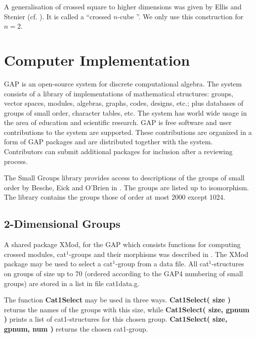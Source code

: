 \documentclass[a4paper,11pt]{article}
\theoremstyle{plain}
\theoremstyle{definition}
\begin{document}
A generalisation of crossed square to higher dimensions was given by Ellis
and Stenier (cf. \cite{Sten}). 
It is called a \textquotedblleft crossed $n$-cube \textquotedblright. 
We only use this construction for $n=2$.


\section{Computer Implementation}

\textsf{GAP} \cite{gap} is an open-source system for discrete computational
algebra. The system consists of a library of implementations of mathematical
structures: groups, vector spaces, modules, algebras, graphs, codes,
designs, etc.; plus databases of groups of small order, character tables,
etc. The system has world wide usage in the area of education and scientific
research. \textsf{GAP} is free software and user contributions to the system
are supported. These contributions are organized in a form of \textsf{GAP}
packages and are distributed together with the system. Contributors can
submit additional packages for inclusion after a reviewing process.

The Small Groups library provides access to descriptions of the groups of
small order by Besche, Eick and O'Brien in \cite{bettina}. The groups are
listed up to isomorphism. The library contains the groups those of order at
most 2000 except 1024.

\subsection{2-Dimensional Groups}

A shared package \textsf{XMod}, for the \textsf{GAP} which consists
functions for computing crossed modules, cat$^{1}$-groups and their
morphisms was described in \cite{alp3}. The \textsf{XMod} package may be
used to select a cat$^{1}$-group from a data file. All cat$^{1}$-structures
on groups of size up to 70 (ordered according to the \textsf{GAP4} numbering of
small groups) are stored in a list in file cat1data.g.

The function \textbf{Cat1Select} may be used in three ways. \textbf{%
	Cat1Select( size )} returns the names of the groups with this size, while
\textbf{Cat1Select( size, gpnum )} prints a list of cat1-structures for this
chosen group. \textbf{Cat1Select( size, gpnum, num )} returns the chosen
cat1-group.
\end{document}

